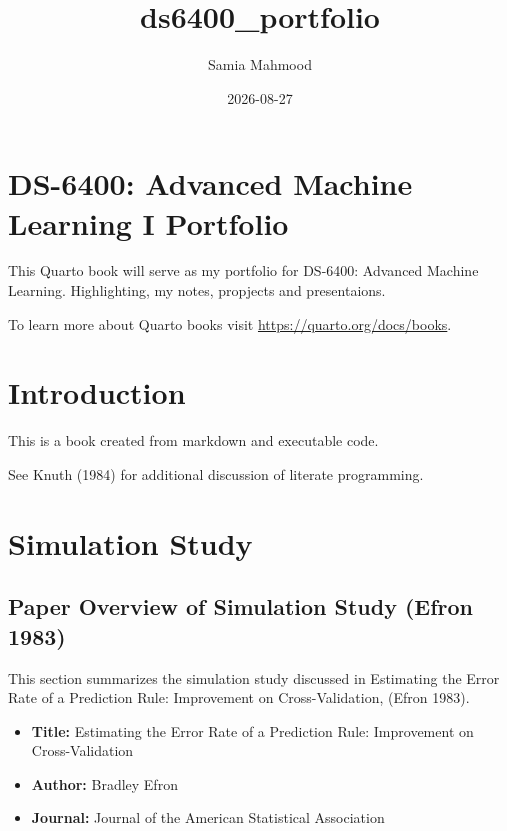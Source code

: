 \documentclass[
  letterpaper,
  DIV=11,
  numbers=noendperiod]{scrreprt}
\title{ds6400\_portfolio}
\author{Samia Mahmood}
\date{2026-08-27}
\providecommand{\tightlist}{%
  \setlength{\itemsep}{0pt}\setlength{\parskip}{0pt}}
\renewcommand*\contentsname{Table of contents}
\newcommand\contentsname{Table of contents}
\begin{document}
\maketitle

\renewcommand*\contentsname{Table of contents}
{
\setcounter{tocdepth}{2}
\tableofcontents
}


\chapter*{DS-6400: Advanced Machine Learning I
Portfolio}\label{ds-6400-advanced-machine-learning-i-portfolio}


This Quarto book will serve as my portfolio for DS-6400: Advanced
Machine Learning. Highlighting, my notes, propjects and presentaions.

To learn more about Quarto books visit
\url{https://quarto.org/docs/books}.


\chapter{Introduction}\label{introduction}

This is a book created from markdown and executable code.

See Knuth (1984) for additional discussion of literate programming.


\chapter{Simulation Study}\label{simulation-study}

\section{Paper Overview of Simulation Study (Efron
1983)}\label{paper-overview-of-simulation-study-efron-1983}

This section summarizes the simulation study discussed in Estimating the
Error Rate of a Prediction Rule: Improvement on Cross-Validation, (Efron
1983).

\begin{itemize}
\tightlist
\item
  \textbf{Title:} Estimating the Error Rate of a Prediction Rule:
  Improvement on Cross-Validation
\item
  \textbf{Author:} Bradley Efron
\item
  \textbf{Journal:} Journal of the American Statistical Association
\end{itemize}
\end{document}
